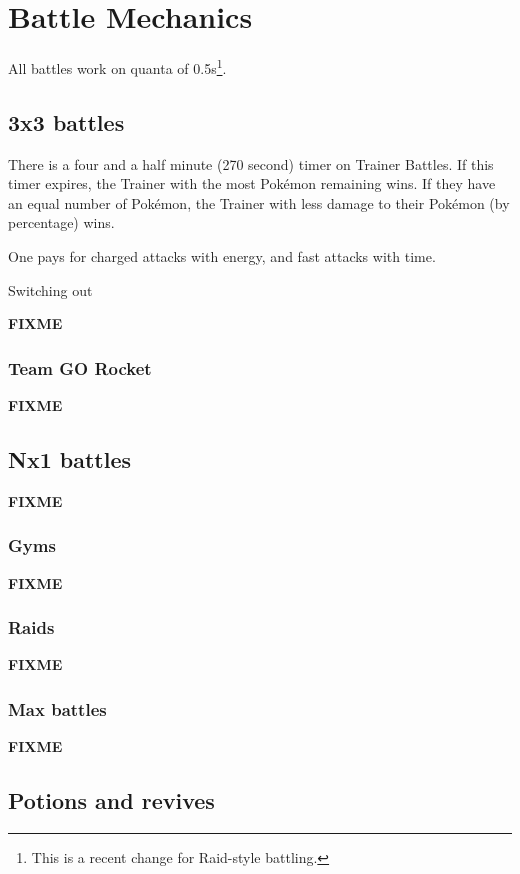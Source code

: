 \chapter{Battle Mechanics}
\label{chap:battle}
All battles work on quanta of 0.5s\footnote{This is a recent change for Raid-style battling.}.

\section{3x3 battles}
\label{sec:3x3}
There is a four and a half minute (270 second) timer on Trainer Battles.
If this timer expires, the Trainer with the most Pokémon remaining wins.
If they have an equal number of Pokémon, the Trainer with less damage to their
  Pokémon (by percentage) wins.

One pays for charged attacks with energy, and fast attacks with time.

Switching out 

\textbf{FIXME}

\subsection{Team GO Rocket}
\label{sec:rocket}
\textbf{FIXME}

\section{Nx1 battles}
\label{sec:nx1}
\textbf{FIXME}

\subsection{Gyms}
\label{sec:gyms}
\textbf{FIXME}

\subsection{Raids}
\label{sec:raids}
\textbf{FIXME}

\subsection{Max battles}
\label{sec:maxbattles}
\textbf{FIXME}

\section{Potions and revives}
